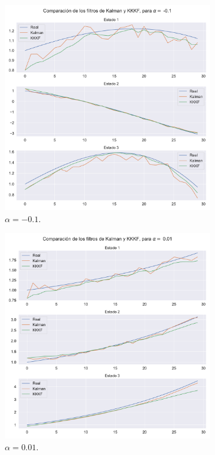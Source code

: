 \begin{figure}[h!]
    \centering
    \begin{subfigure}[b]{0.49\textwidth}
        \centering
        \includegraphics[width=0.75\linewidth]{img/content/chapter4/kalman_vs_kerKKF_01.pdf}
    \caption{$\alpha = -0.1$.}
    \label{fig:kalman_vs_kerKKF_01}
    \end{subfigure}
    \begin{subfigure}[b]{0.49\textwidth}
        \centering \includegraphics[width=0.75\linewidth]{img/content/chapter4/kalman_vs_kerKKF_001.pdf}
    \caption{$\alpha = 0.01$.}
    \label{fig:kalman_vs_kerKKF_001}
    \end{subfigure}
    \begin{subfigure}[b]{0.49\textwidth}

\end{subfigure}
\end{figure}
